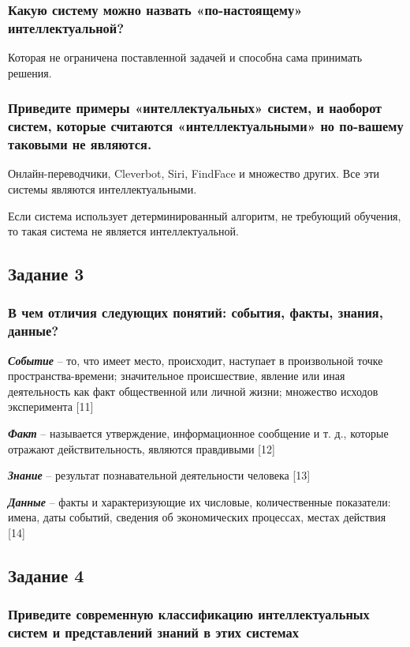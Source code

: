 \documentclass[14pt,a4paper,report]{report}
\begin{document}
\subsubsection{Какую систему можно назвать «по-настоящему» интеллектуальной?}

Которая не ограничена поставленной задачей и способна сама принимать решения.

\subsubsection{Приведите примеры «интеллектуальных» систем, и наоборот систем, которые считаются «интеллектуальными» но по-вашему таковыми не являются.}

Онлайн-переводчики, Cleverbot, Siri, FindFace и множество других. Все эти системы являются интеллектуальными.

Если система использует детерминированный алгоритм, не требующий обучения, то такая система не является интеллектуальной.

\subsection{Задание 3}

\subsubsection{В чем отличия следующих понятий: события, факты, знания, данные?}

\emph{\textbf{Событие}} -- то, что имеет место, происходит, наступает в произвольной точке пространства-времени; значительное происшествие, явление или иная деятельность как факт общественной или личной жизни; множество исходов эксперимента [11]

\emph{\textbf{Факт}} -- называется утверждение, информационное сообщение и т. д., которые отражают действительность, являются правдивыми [12]

\emph{\textbf{Знание}} -- результат познавательной деятельности человека [13]

\emph{\textbf{Данные}} -- факты и характеризующие их числовые, количественные показатели: имена, даты событий, сведения об экономических процессах, местах действия [14]

\subsection{Задание 4}

\subsubsection{Приведите современную классификацию интеллектуальных систем и представлений знаний в этих системах}
\end{document}
